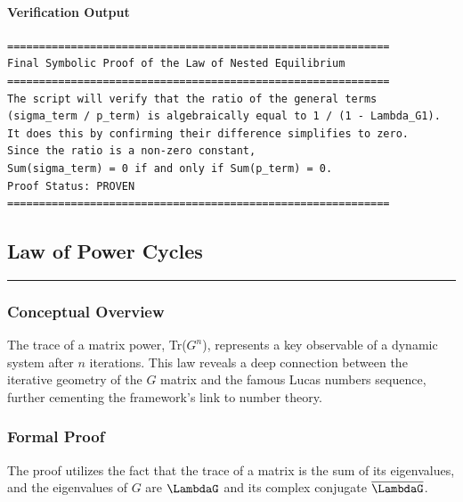 \paragraph{Verification Output}
\begin{verbatim}
============================================================
Final Symbolic Proof of the Law of Nested Equilibrium
============================================================
The script will verify that the ratio of the general terms
(sigma_term / p_term) is algebraically equal to 1 / (1 - Lambda_G1).
It does this by confirming their difference simplifies to zero.
Since the ratio is a non-zero constant,
Sum(sigma_term) = 0 if and only if Sum(p_term) = 0.
Proof Status: PROVEN
============================================================
\end{verbatim}


\subsection*{Law of Power Cycles}
\hrule
\vspace{0.3cm}
\vspace{0.5cm}

\subsubsection*{Conceptual Overview}
The trace of a matrix power, Tr($G^n$), represents a key observable of a dynamic system after $n$ iterations. This law reveals a deep connection between the iterative geometry of the $G$ matrix and the famous Lucas numbers sequence, further cementing the framework's link to number theory.

\subsubsection*{Formal Proof}
The proof utilizes the fact that the trace of a matrix is the sum of its eigenvalues, and the eigenvalues of $G$ are $\LambdaG$ and its complex conjugate $\overline{\LambdaG}$.

